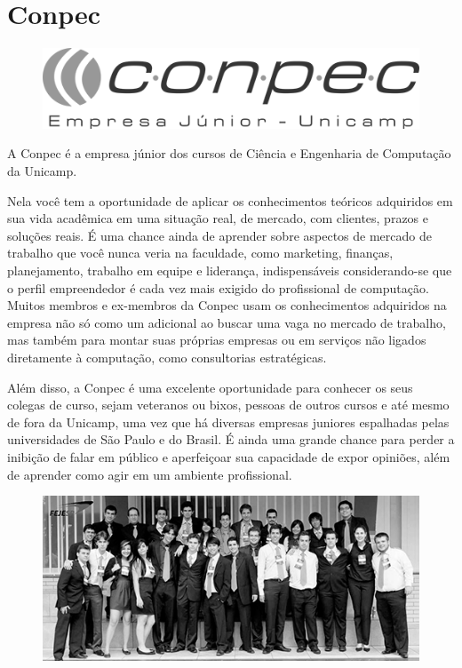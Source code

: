 \newpage
\section{Conpec}

\begin{figure}[H]
    \centering
    \includegraphics[scale=0.40]{img/conpec.png}
\end{figure}

A Conpec é a empresa júnior dos cursos de Ciência e Engenharia de Computação da
Unicamp.

Nela você tem a oportunidade de aplicar os conhecimentos teóricos
adquiridos em sua vida acadêmica em uma situação real, de mercado, com clientes,
prazos e soluções reais. É uma chance ainda de aprender sobre aspectos de mercado de trabalho que você
nunca veria na faculdade, como marketing, finanças, planejamento, trabalho em equipe e liderança,
indispensáveis considerando-se que o perfil empreendedor é cada vez mais exigido do profissional de
computação. Muitos membros e ex-membros da Conpec usam os
conhecimentos adquiridos na empresa não só como um adicional ao buscar uma vaga
no mercado de trabalho, mas também para montar suas próprias empresas ou em
serviços não ligados diretamente à computação, como consultorias estratégicas.

Além disso, a Conpec é uma excelente oportunidade para conhecer os seus colegas
de curso, sejam veteranos ou bixos, pessoas de outros cursos e até mesmo de fora da
Unicamp, uma vez que há diversas empresas juniores espalhadas pelas universidades de São Paulo e do Brasil. É ainda uma grande chance para perder a inibição de falar em
público e aperfeiçoar sua capacidade de expor opiniões, além de aprender como
agir em um ambiente profissional.

\begin{figure}[H]
    \centering
    \includegraphics[scale=0.40]{img/conpec_foto.jpg}
\end{figure}

